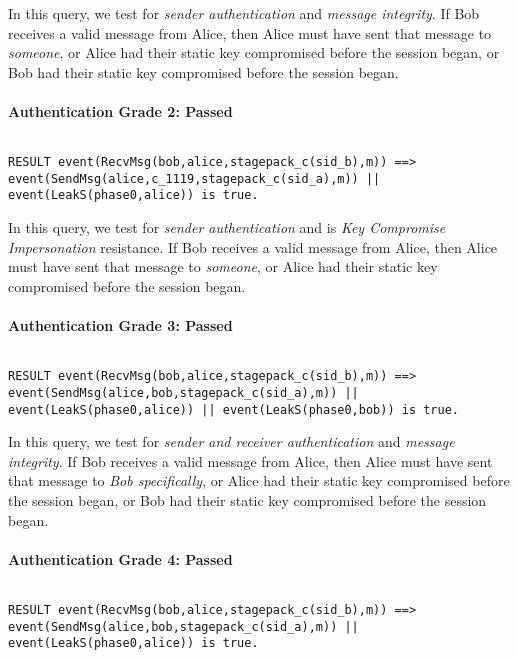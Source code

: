 In this query, we test for \emph{sender authentication} and \emph{message integrity}. If Bob receives a valid message from Alice, then Alice must have sent that message to \emph{someone}, or Alice had their static key compromised before the session began, or Bob had their static key compromised before the session began.


\paragraph{Authentication Grade 2: Passed}$ $
\begin{lstlisting}
RESULT event(RecvMsg(bob,alice,stagepack_c(sid_b),m)) ==> event(SendMsg(alice,c_1119,stagepack_c(sid_a),m)) || event(LeakS(phase0,alice)) is true.
\end{lstlisting}

In this query, we test for \emph{sender authentication} and is \emph{Key Compromise Impersonation} resistance. If Bob receives a valid message from Alice, then Alice must have sent that message to \emph{someone}, or Alice had their static key compromised before the session began.


\paragraph{Authentication Grade 3: Passed}$ $
\begin{lstlisting}
RESULT event(RecvMsg(bob,alice,stagepack_c(sid_b),m)) ==> event(SendMsg(alice,bob,stagepack_c(sid_a),m)) || event(LeakS(phase0,alice)) || event(LeakS(phase0,bob)) is true.
\end{lstlisting}

In this query, we test for \emph{sender and receiver authentication} and \emph{message integrity}. If Bob receives a valid message from Alice, then Alice must have sent that message to \emph{Bob specifically}, or Alice had their static key compromised before the session began, or Bob had their static key compromised before the session began.


\paragraph{Authentication Grade 4: Passed}$ $
\begin{lstlisting}
RESULT event(RecvMsg(bob,alice,stagepack_c(sid_b),m)) ==> event(SendMsg(alice,bob,stagepack_c(sid_a),m)) || event(LeakS(phase0,alice)) is true.
\end{lstlisting}


